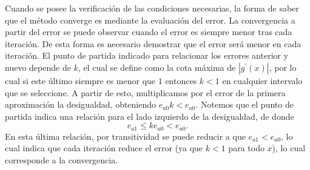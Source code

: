 \documentclass[12pt]{article}
\begin{document}
\begin{enumerate}[leftmargin=*,widest=9]
Cuando se posee la verificación de las condiciones necesarias, la forma de saber que el método converge es mediante la evaluación del error. La convergencia a partir del error se puede observar cuando el error es siempre menor tras cada iteración. De esta forma es necesario demostrar que el error será menor en cada iteración.
El punto de partida indicado para relacionar los errores anterior y nuevo depende de \(k\), el cual se define como la cota máxima de \(|g^{\prime}(x)|\), por lo cual si este último siempre es menor que \(1\) entonces \(k<1\) en cualquier intervalo que se seleccione. A partir de esto, multiplicamos por el error de la primera aproximación la desigualdad, obteniendo \(e_{a0}k < e_{a0}\). Notemos que el punto de partida indica una relación para el lado izquierdo de la desigualdad, de donde
\[ e_{a1} \leq ke_{a0} < e_{a0}.\]
En esta última relación, por transitividad se puede reducir a que \(e_{a1}<e_{a0}\), lo cual indica que cada iteración reduce el error (ya que \(k<1\) para todo \(x\)), lo cual corresponde a la convergencia.
\end{enumerate}
\end{document}
